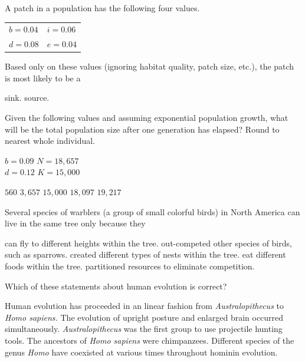 \question
A patch in a population has the following four values. 

\qquad\begin{tabular}{@{}ll@{}}
	$b = 0.04$ & $i = 0.06$\\
	$d = 0.08$ & $e = 0.04$\\
\end{tabular}

Based only on these values (ignoring habitat quality, patch size, etc.), the patch is most likely to be a 

\begin{choices}
\correctchoice sink.
\choice  source. 
\end{choices}

\question
Given the following values and assuming exponential population growth, what will be the total population size after one generation has elapsed? Round to nearest whole individual.\vspace{1ex}

\hspace{\leftmargin}%
\begin{minipage}{2in}
$b = 0.09$ \qquad $N = 18,657$\\
$d = 0.12$ \qquad $K = 15,000$\\
\end{minipage}

\begin{choices}
\choice $560$ %
\choice $3,657$ %
\choice $15,000$ %
\correctchoice $18,097$ %
\choice $19,217$ %
\end{choices}

\question
Several species of warblers (a group of small colorful birds) in North America can live in the same tree only because they

\begin{choices}
\choice can fly to different heights within the tree.
\choice out-competed other species of birds, such as sparrows.
\choice created different types of nests within the tree.
\choice eat different foods within the tree.
\correctchoice partitioned resources to eliminate competition.
\end{choices}

\question
Which of these statements about human evolution is correct?  

\begin{choices}
\choice Human evolution has proceeded in an linear fashion from \textit{Australopithecus} to \textit{Homo sapiens.}   
\choice The evolution of upright posture and enlarged brain occurred simultaneously.   
\choice \textit{Australopithecus} was the first group to use projectile hunting tools. 
\choice The ancestors of \textit{Homo sapiens} were chimpanzees.   
\correctchoice Different species of the genus \textit{Homo} have coexisted at various times throughout hominin evolution.   
\end{choices}

